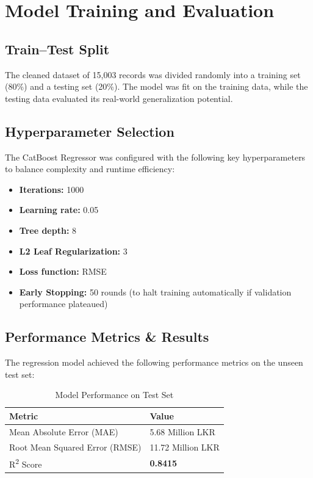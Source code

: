 \documentclass[12pt]{article}
\begin{document}
\section{Model Training and Evaluation}

\subsection{Train--Test Split}
The cleaned dataset of 15,003 records was divided randomly into a training set (80\%) and a testing set (20\%). The model was fit on the training data, while the testing data evaluated its real-world generalization potential.

\subsection{Hyperparameter Selection}
The CatBoost Regressor was configured with the following key hyperparameters to balance complexity and runtime efficiency:
\begin{itemize}
    \item \textbf{Iterations:} 1000
    \item \textbf{Learning rate:} 0.05
    \item \textbf{Tree depth:} 8
    \item \textbf{L2 Leaf Regularization:} 3
    \item \textbf{Loss function:} RMSE
    \item \textbf{Early Stopping:} 50 rounds (to halt training automatically if validation performance plateaued)
\end{itemize}

\subsection{Performance Metrics \& Results}
The regression model achieved the following performance metrics on the unseen test set:

\begin{table}[H]
    \centering
    \begin{tabular}{@{}ll@{}}
        \toprule
        \textbf{Metric} & \textbf{Value} \\ \midrule
        Mean Absolute Error (MAE) & 5.68 Million LKR \\
        Root Mean Squared Error (RMSE) & 11.72 Million LKR \\
        R\textsuperscript{2} Score & \textbf{0.8415} \\ \bottomrule
    \end{tabular}
    \caption{Model Performance on Test Set}
\end{table}
\end{document}
